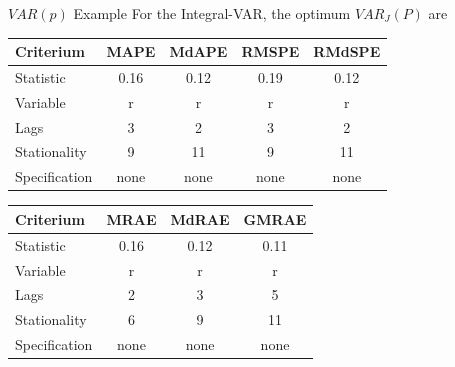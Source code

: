\documentclass{beamer}
\newcommand{\?}{?`}
\begin{document}
\begin{frame}{$VAR(p)$ Example}
  For the Integral-VAR, the optimum $VAR_J(P)$ are

    \medskip

  \begin{footnotesize}
  \begin{tabular}{|l|c|c|c|c|}
    \hline
    Criterium & MAPE & MdAPE & RMSPE & RMdSPE \\
    \hline
   Statistic & 0.16 & 0.12 & 0.19 & 0.12 \\
    Variable & r & r & r & r \\
    Lags & 3 & 2 & 3 & 2 \\
    Stationality & 9 & 11 & 9 & 11 \\
    Specification & none & none & none & none \\
    \hline
  \end{tabular}
  \end{footnotesize}

  \begin{footnotesize}
  \begin{tabular}{|l|c|c|c|}
    \hline
    Criterium & MRAE & MdRAE & GMRAE \\
    \hline
    Statistic & 0.16 & 0.12 & 0.11 \\
    Variable & r & r & r \\
    Lags & 2 & 3 & 5 \\
    Stationality & 6 & 9 & 11 \\
    Specification & none& none& none \\
    \hline
  \end{tabular}
  \end{footnotesize}
  \medskip
\end{frame}
\end{document}
